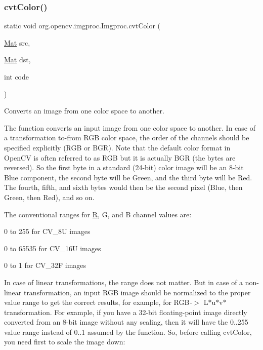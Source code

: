 \subsubsection{\texorpdfstring{cvt\+Color()}{cvtColor()}\hspace{0.1cm}{\footnotesize\ttfamily [2/2]}}
{\footnotesize\ttfamily static void org.\+opencv.\+imgproc.\+Imgproc.\+cvt\+Color (\begin{DoxyParamCaption}\item[{\mbox{\hyperlink{classorg_1_1opencv_1_1core_1_1_mat}{Mat}}}]{src,  }\item[{\mbox{\hyperlink{classorg_1_1opencv_1_1core_1_1_mat}{Mat}}}]{dst,  }\item[{int}]{code }\end{DoxyParamCaption})\hspace{0.3cm}{\ttfamily [static]}}

Converts an image from one color space to another.

The function converts an input image from one color space to another. In case of a transformation to-\/from R\+GB color space, the order of the channels should be specified explicitly (R\+GB or B\+GR). Note that the default color format in Open\+CV is often referred to as R\+GB but it is actually B\+GR (the bytes are reversed). So the first byte in a standard (24-\/bit) color image will be an 8-\/bit Blue component, the second byte will be Green, and the third byte will be Red. The fourth, fifth, and sixth bytes would then be the second pixel (Blue, then Green, then Red), and so on.

The conventional ranges for \mbox{\hyperlink{classorg_1_1opencv_1_1_r}{R}}, G, and B channel values are\+:


\begin{DoxyItemize}
\item 0 to 255 for {\ttfamily C\+V\+\_\+8U} images 
\item 0 to 65535 for {\ttfamily C\+V\+\_\+16U} images 
\item 0 to 1 for {\ttfamily C\+V\+\_\+32F} images 
\end{DoxyItemize}

In case of linear transformations, the range does not matter. But in case of a non-\/linear transformation, an input R\+GB image should be normalized to the proper value range to get the correct results, for example, for R\+GB{\itshape -\/$>$} L$\ast$u$\ast$v$\ast$ transformation. For example, if you have a 32-\/bit floating-\/point image directly converted from an 8-\/bit image without any scaling, then it will have the 0..255 value range instead of 0..1 assumed by the function. So, before calling {\ttfamily cvt\+Color}, you need first to scale the image down\+: {\ttfamily }

